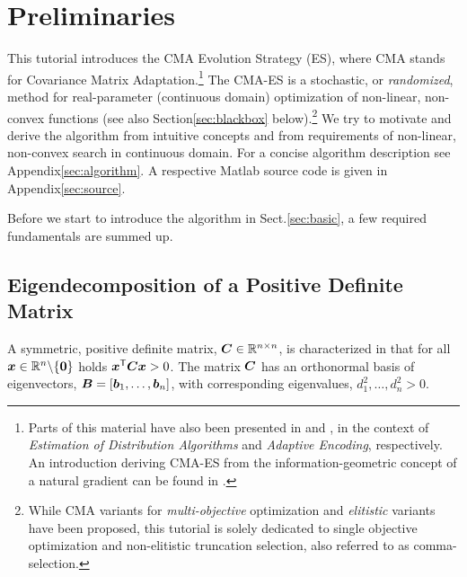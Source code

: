 \documentclass{article} %
\newcommand{\tutorial}[1]{{#1}}
\newcommand{\R}{\mathbb{R}}
\newcommand{\ve}[1]{\mathchoice{\mbox{\boldmath$\displaystyle#1$}}
  {\mbox{\boldmath$\textstyle#1$}} {\mbox{\boldmath$\scriptstyle#1$}}
  {\mbox{\boldmath$\scriptscriptstyle#1$}}}
\newcommand{\ma}[1]{\mathchoice{\mbox{\boldmath$\displaystyle#1$}}
  {\mbox{\boldmath$\textstyle#1$}} {\mbox{\boldmath$\scriptstyle#1$}}
  {\mbox{\boldmath$\scriptscriptstyle#1$}}}
\newcommand{\T}{\ensuremath{\mathsf{T}}}
\newcommand{\N}{\ensuremath{n}}
\newcommand{\Rn}{\R^{\N}}
\newcommand{\ew}{d^2}
\newcommand{\nref}[1]{\nolinebreak[4]\hspace{0.2845em plus0.05em minus0.17em}\nolinebreak[4]\ref{#1}}
\newcommand{\pref}[1]{\mbox{.\hspace{0.235em}\ref{#1}}}
\begin{document}
\tutorial{
\setcounter{section}{-1}
\section{Preliminaries}
 This tutorial introduces the CMA Evolution Strategy (ES), where CMA
 stands for Covariance Matrix Adaptation.\footnote{%
% 
 Parts of this material have also been presented in \cite{Hansen:2006}
 and \cite{hansen2010habil}, in the context of 
 \emph{Estimation of Distribution Algorithms} and \emph{Adaptive Encoding}, 
 respectively. An introduction deriving CMA-ES from the 
 information-geometric concept of a natural
 gradient can be found in \cite{hansen2014principled}.} 
%
 The CMA-ES is a stochastic, 
 or \emph{randomized},
 method for real-parameter (continuous domain) optimization of
 non-linear, non-convex functions (see also Section\nref{sec:blackbox}
 below).\footnote{While CMA variants for \emph{multi-objective}
 optimization and \emph{elitistic} variants have been proposed, this
 tutorial is solely dedicated to single objective optimization and
 non-elitistic truncation selection, also referred to as
 comma-selection.  } We try to motivate and derive the algorithm from
 intuitive concepts and from requirements of non-linear, non-convex
 search in continuous domain.
%
 For a concise
 algorithm description see
 Appendix\nref{sec:algorithm}. A respective Matlab source code is
 given in Appendix\nref{sec:source}.

Before we start to introduce the algorithm in
 Sect\pref{sec:basic}, a few required fundamentals are summed up.

\subsection{Eigendecomposition of a Positive Definite Matrix\label{sec:eigen}}
A symmetric, positive definite matrix, $\ma{C}\in\R^{\N\times\N}$, is
characterized in that for all $\ve{x}\in\Rn\backslash\{\ve{0}\}$ holds
$\ve{x}^\T\ma{C}\ve{x}>0$. The matrix $\ma{C}$ has an orthonormal
basis of eigenvectors, $\ma{B}=[\ve{b}_1,\dots,\ve{b}_\N]$, with
corresponding eigenvalues, $\ew_1,\dots,\ew_\N>0$.

}
\end{document}
